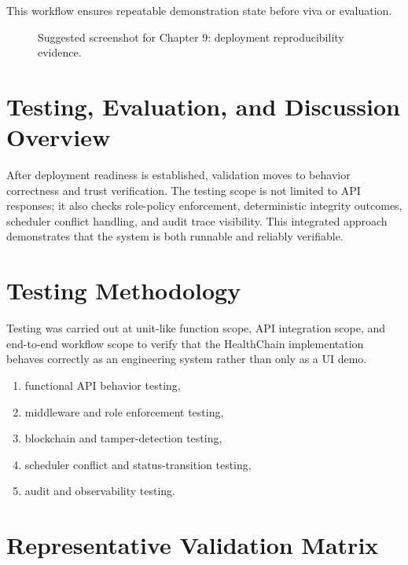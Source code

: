\documentclass[12pt,a4paper]{report}
\begin{document}
This workflow ensures repeatable demonstration state before viva or evaluation.

\begin{figure}[H]
\centering
{}
\caption{Suggested screenshot for Chapter 9: deployment reproducibility evidence.}
\label{fig:placeholder-deployment-run}
\end{figure}

\section{Testing, Evaluation, and Discussion Overview}

After deployment readiness is established, validation moves to behavior correctness and trust verification. The testing scope is not limited to API responses; it also checks role-policy enforcement, deterministic integrity outcomes, scheduler conflict handling, and audit trace visibility. This integrated approach demonstrates that the system is both runnable and reliably verifiable.

\section{Testing Methodology}

Testing was carried out at unit-like function scope, API integration scope, and end-to-end workflow scope to verify that the HealthChain implementation behaves correctly as an engineering system rather than only as a UI demo.

\begin{enumerate}
\item functional API behavior testing,
\item middleware and role enforcement testing,
\item blockchain and tamper-detection testing,
\item scheduler conflict and status-transition testing,
\item audit and observability testing.
\end{enumerate}

\section{Representative Validation Matrix}
\end{document}
